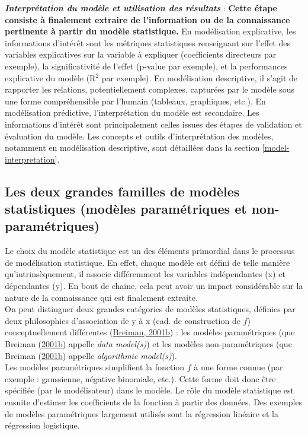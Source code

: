 \documentclass[12pt,twoside]{reedthesis}
\begin{document}
\textbf{\emph{Interprétation du modèle et utilisation des résultats}} : \textbf{Cette étape consiste à finalement extraire de l'information ou de la connaissance pertinente à partir du modèle statistique.} En modélisation explicative, les informations d'intérêt sont les métriques statistiques renseignant sur l'effet des variables explicatives sur la variable à expliquer (coefficients directeurs par exemple), la significativité de l'effet (p-value par exemple), et la performances explicative du modèle (R\(^{2}\) par exemple). En modélisation descriptive, il s'agit de rapporter les relations, potentiellement complexes, capturées par le modèle sous une forme compréhensible par l'humain (tableaux, graphiques, etc.). En modélisation prédictive, l'interprétation du modèle est secondaire. Les informations d'intérêt sont principalement celles issues des étapes de validation et évaluation du modèle. Les concepts et outils d'interprétation des modèles, notamment en modélisation descriptive, sont détaillées dans la section \ref{model-interpretation}.\\

\hypertarget{model-categories}{%
\subsection{Les deux grandes familles de modèles statistiques (modèles paramétriques et non-paramétriques)}\label{model-categories}}

Le choix du modèle statistique est un des éléments primordial dans le processus de modélisation statistique. En effet, chaque modèle est défini de telle manière qu'intrinsèquement, il associe différemment les variables indépendantes (x) et dépendantes (y). En bout de chaine, cela peut avoir un impact considérable sur la nature de la connaissance qui est finalement extraite.\\

On peut distinguer deux grandes catégories de modèles statistiques, définies par deux philosophies d'association de y à x (cad. de construction de \(f\)) conceptuellement différentes (\protect\hyperlink{ref-breiman_statistical_2001}{Breiman, 2001b}) : les modèles paramétriques (que Breiman (\protect\hyperlink{ref-breiman_statistical_2001}{2001b}) appelle \emph{data model(s)}) et les modèles non-paramétriques (que Breiman (\protect\hyperlink{ref-breiman_statistical_2001}{2001b}) appelle \emph{algorithmic model(s)}).\\

Les modèles paramétriques simplifient la fonction \(f\) à une forme connue (par exemple : gaussienne, négative binomiale, etc.). Cette forme doit donc être spécifiée (par le modélisateur) dans le modèle. Le rôle du modèle statistique est ensuite d'estimer les coefficients de la fonction à partir des données. Des exemples de modèles paramétriques largement utilisés sont la régression linéaire et la régression logistique.\\
\end{document}
